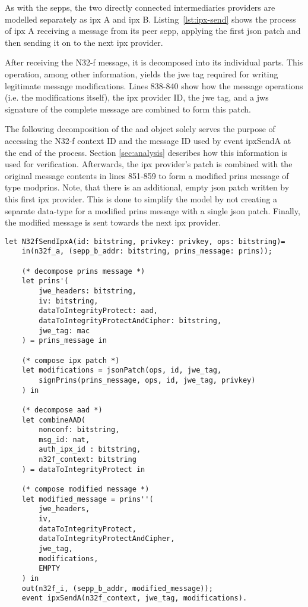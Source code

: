 As with the \glspl{sepp}, the two directly connected intermediaries providers are modelled separately as \gls{ipx} A and \gls{ipx} B.
Listing~\ref{lst:ipx-send} shows the process of \gls{ipx} A receiving a message from its peer \gls{sepp}, applying the first \gls{json} patch and then sending it on to the next \gls{ipx} provider.

After receiving the N32-f message, it is decomposed into its individual parts.
This operation, among other information, yields the \gls{jwe} tag required for writing legitimate message modifications.
Lines 838-840 show how the message operations (i.e. the modifications itself), the \gls{ipx} provider ID, the \gls{jwe} tag, and a \gls{jws} signature of the complete message are combined to form this patch.

The following decomposition of the \gls{aad} object solely serves the purpose of accessing the N32-f context ID and the message ID used by event {\sffamily ipxSendA} at the end of the process.
Section \ref{sec:analysis} describes how this information is used for verification.
Afterwards, the \gls{ipx} provider's patch is combined with the original message contents in lines 851-859 to form a modified \gls{prins} message of type {\sffamily modprins}.
Note, that there is an additional, empty \gls{json} patch written by this first \gls{ipx} provider.
This is done to simplify the model by not creating a separate data-type for a modified \gls{prins} message with a single \gls{json} patch.
Finally, the modified message is sent towards the next \gls{ipx} provider.

\begin{lstlisting}[caption={Definition of the sending IPX process},label={lst:ipx-send},firstnumber=825]
let N32fSendIpxA(id: bitstring, privkey: privkey, ops: bitstring)=
    in(n32f_a, (sepp_b_addr: bitstring, prins_message: prins));

    (* decompose prins message *)
    let prins'(
        jwe_headers: bitstring,
        iv: bitstring,
        dataToIntegrityProtect: aad,
        dataToIntegrityProtectAndCipher: bitstring,
        jwe_tag: mac
    ) = prins_message in

    (* compose ipx patch *)
    let modifications = jsonPatch(ops, id, jwe_tag,
        signPrins(prins_message, ops, id, jwe_tag, privkey)
    ) in

    (* decompose aad *)
    let combineAAD(
        nonconf: bitstring,
        msg_id: nat,
        auth_ipx_id : bitstring,
        n32f_context: bitstring
    ) = dataToIntegrityProtect in

    (* compose modified message *)
    let modified_message = prins''(
        jwe_headers,
        iv,
        dataToIntegrityProtect,
        dataToIntegrityProtectAndCipher,
        jwe_tag,
        modifications,
        EMPTY
    ) in
    out(n32f_i, (sepp_b_addr, modified_message));
    event ipxSendA(n32f_context, jwe_tag, modifications).
\end{lstlisting}


